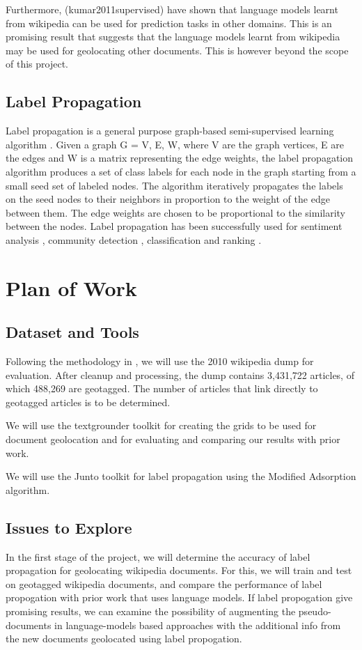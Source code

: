 \documentclass[11pt]{article}
\newcommand{\comment}[1]{}
\begin{document}
Furthermore, (kumar2011supervised) have shown that language models learnt from wikipedia can be used for prediction tasks in other domains. This is an 
promising result that suggests that the language models learnt from wikipedia may be used for geolocating other documents. This is however beyond the scope
of this project.


\subsection{Label Propagation}
Label propagation is a general purpose graph-based semi-supervised learning algorithm \cite{talukdar:09} \cite{talukdar:10}. 
Given a graph G = {V, E, W}, where V are the graph vertices, E are the edges and W is a matrix representing the edge weights, 
the label propagation algorithm produces a set of class labels for each node in the graph starting from a small seed set of labeled nodes. 
The algorithm iteratively propagates the labels on the seed nodes to their neighbors in proportion to the weight of the edge between them. 
The edge weights are chosen to be proportional to the similarity between the nodes. 
Label propagation has been successfully used for sentiment analysis \cite{sperisou}, community detection \cite{talukdar}, 
classification and ranking \cite{something} \comment{and recommendation, youtube}. 




\section{Plan of Work}
\subsection{Dataset and Tools}
Following the methodology in \cite{wing-baldridge:11}, we will use the 2010 wikipedia dump for evaluation. 
After cleanup and processing, the dump contains 3,431,722  articles, of which 488,269 are geotagged. 
The number of articles that link directly to geotagged articles is to be determined.

We will use the textgrounder \cite{textgrounder} toolkit for creating the grids to be used for document geolocation and for evaluating 
and comparing our results with prior work.
 
We will use the Junto toolkit \cite{junto} for label propagation using the Modified Adsorption algorithm.

\subsection{Issues to Explore}
In the first stage of the project, we will determine the accuracy of label propagation for geolocating wikipedia documents. 
For this, we will train and test on geotagged wikipedia documents, and compare the performance of label propogation with prior work that uses language models.
If label propogation give promising results, we can examine the possibility of augmenting the pseudo-documents in language-models based approaches 
with the additional info from the new documents geolocated using label propogation.
\end{document}
